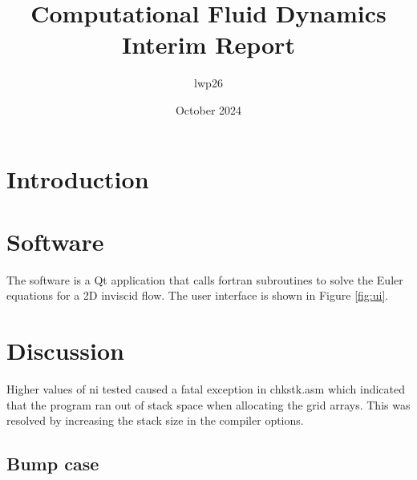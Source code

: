 \documentclass{article}
\begin{document}
\title{Computational Fluid Dynamics \\
    \large Interim Report}
\author{lwp26}
\date{October 2024}
\maketitle 

\section{Introduction}

\section{Software}

The software is a Qt application that calls fortran subroutines to solve the Euler equations for a 2D inviscid flow. The user interface is shown in Figure \ref{fig:ui}.


\section{Discussion}



Higher values of ni tested caused a fatal exception in chkstk.asm which indicated that the program ran out of stack space when allocating the grid arrays.
This was resolved by increasing the stack size in the compiler options.

\subsection{Bump case}
\end{document}
